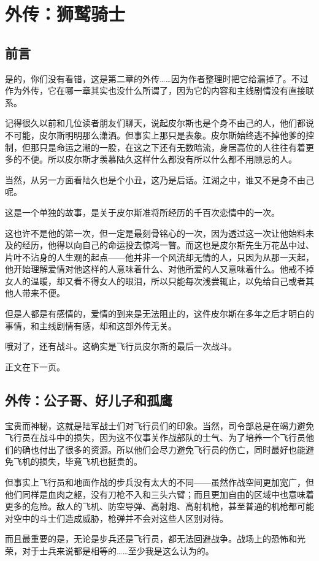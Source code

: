 \chapter{外传：狮鹫骑士}

\section*{前言}
是的，你们没有看错，这是第二章的外传……因为作者整理时把它给漏掉了。不过作为外传，它在哪一章其实也没什么所谓了，因为它的内容和主线剧情没有直接联系。

记得很久以前和几位读者朋友们聊天，说起皮尔斯也是个身不由己的人，他们都说不可能，皮尔斯明明那么潇洒。但事实上那只是表象。皮尔斯始终逃不掉他爹的控制，但那只是命运之潮的一股，在这之下还有无数暗流，身居高位的人往往有着更多的不便。所以皮尔斯才羡慕陆久这样什么都没有所以什么都不用顾忌的人。

当然，从另一方面看陆久也是个小丑，这乃是后话。江湖之中，谁又不是身不由己呢。

\lineseparator

这是一个单独的故事，是关于皮尔斯准将所经历的千百次恋情中的一次。

这也许不是他的第一次，但一定是最刻骨铭心的一次，因为透过这一次让他始料未及的经历，他得以向自己的命运投去惊鸿一瞥。而这也是皮尔斯先生万花丛中过、片叶不沾身的人生观的起点——他并非一个风流却无情的人，只因为从那一天起，他开始理解爱情对他这样的人意味着什么、对他所爱的人又意味着什么。他戒不掉女人的温暖，却又看不得女人的眼泪，所以只能每次浅尝辄止，以免给自己或者其他人带来不便。

但是人都是有感情的，爱情的到来是无法阻止的，这件皮尔斯在多年之后才明白的事情，和主线剧情有感，却和这部外传无关。

哦对了，还有战斗。这确实是飞行员皮尔斯的最后一次战斗。

正文在下一页。

\lineseparator

\section*{外传：公子哥、好儿子和孤鹰}

\begin{QuoteEnv}{}
宝贵而神秘，这就是陆军战士们对飞行员们的印象。当然，司令部总是在竭力避免飞行员在战斗中的损失，因为这不仅事关作战部队的士气、为了培养一个飞行员他们的确也付出了很多的资源。所以他们会尽力避免飞行员的伤亡，同时最好也能避免飞机的损失，毕竟飞机也挺贵的。

但事实上飞行员和地面作战的步兵没有太大的不同——虽然作战空间更加宽广，但他们同样是血肉之躯，没有刀枪不入和三头六臂；而且更加自由的区域中也意味着更多的危险。敌人的飞机、防空导弹、高射炮、高射机枪，甚至普通的机枪都可能对空中的斗士们造成威胁，枪弹并不会对这些人区别对待。

而且最重要的是，无论是步兵还是飞行员，都无法回避战争。战场上的恐怖和光荣，对于士兵来说都是相等的……至少我是这么认为的。
\end{QuoteEnv}

